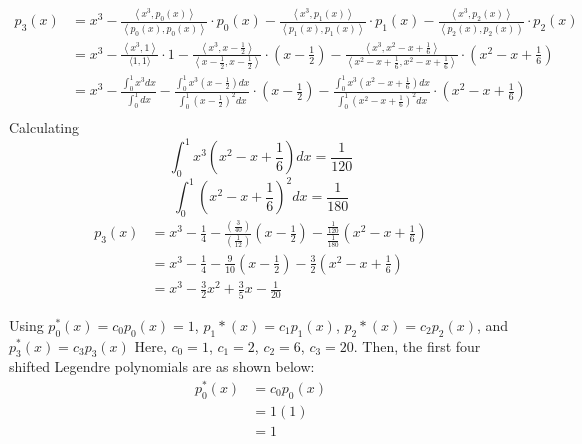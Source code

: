 $$
\begin{aligned}
p_{3}(x) &=x^{3}-\frac{\left\langle x^{3}, p_{0}(x)\right\rangle}{\left\langle p_{0}(x), p_{0}(x)\right\rangle} \cdot p_{0}(x)-\frac{\left\langle x^{3}, p_{1}(x)\right\rangle}{\left\langle p_{1}(x), p_{1}(x)\right\rangle} \cdot p_{1}(x)-\frac{\left\langle x^{3}, p_{2}(x)\right\rangle}{\left\langle p_{2}(x), p_{2}(x)\right)} \cdot p_{2}(x) \\
&=x^{3}-\frac{\left\langle x^{3}, 1\right\rangle}{\langle 1,1\rangle} \cdot 1-\frac{\left\langle x^{3}, x-\frac{1}{2}\right\rangle}{\left\langle x-\frac{1}{2}, x-\frac{1}{2}\right\rangle} \cdot\left(x-\frac{1}{2}\right)-\frac{\left\langle x^{3}, x^{2}-x+\frac{1}{6}\right\rangle}{\left\langle x^{2}-x+\frac{1}{6}, x^{2}-x+\frac{1}{6}\right\rangle} \cdot\left(x^{2}-x+\frac{1}{6}\right) \\
&=x^{3}-\frac{\int_{0}^{1} x^{3} d x}{\int_{0}^{1} d x}-\frac{\int_{0}^{1} x^{3}\left(x-\frac{1}{2}\right) d x}{\int_{0}^{1}\left(x-\frac{1}{2}\right)^{2} d x} \cdot\left(x-\frac{1}{2}\right)-\frac{\int_{0}^{1} x^{3}\left(x^{2}-x+\frac{1}{6}\right) d x}{\int_{0}^{1}\left(x^{2}-x+\frac{1}{6}\right)^{2} d x} \cdot\left(x^{2}-x+\frac{1}{6}\right)\\
\end{aligned}
$$
Calculating
$$
\int_{0}^{1} x^{3}\left(x^{2}-x+\frac{1}{6}\right) d x=\frac{1}{120}$$
$$ \int_{0}^{1}\left(x^{2}-x+\frac{1}{6}\right)^{2} d x=\frac{1}{180}$$
$$
\begin{aligned}
p_{3}(x)&=x^{3}-\frac{1}{4}-\frac{\left(\frac{3}{40}\right)}{\left(\frac{1}{12}\right)}\left(x-\frac{1}{2}\right)-\frac{\frac{1}{120}}{\frac{1}{180}}\left(x^{2}-x+\frac{1}{6}\right) \\
&=x^{3}-\frac{1}{4}-\frac{9}{10}\left(x-\frac{1}{2}\right)-\frac{3}{2}\left(x^{2}-x+\frac{1}{6}\right) \\
&=x^{3}-\frac{3}{2} x^{2}+\frac{3}{5} x-\frac{1}{20}
\end{aligned}
$$

Using $p_{0}^{*}(x)=c_{0} p_{0}(x)=1$, $p_{1} *(x)=c_{1} p_{1}(x)$, $p_{2} *(x)=c_{2} p_{2}(x)$, and $p_{3}^{*}(x)=c_{3} p_{3}(x)$ Here, $c_{0}=1$, $c_{1}=2$, $c_{2}=6$, $c_{3}=20$. Then, the first four shifted Legendre polynomials are as shown below:
$$
\begin{aligned}
p_{0}^{*}(x) &=c_{0} p_{0}(x) \\
&=1(1) \\
&=1
\end{aligned}
$$


